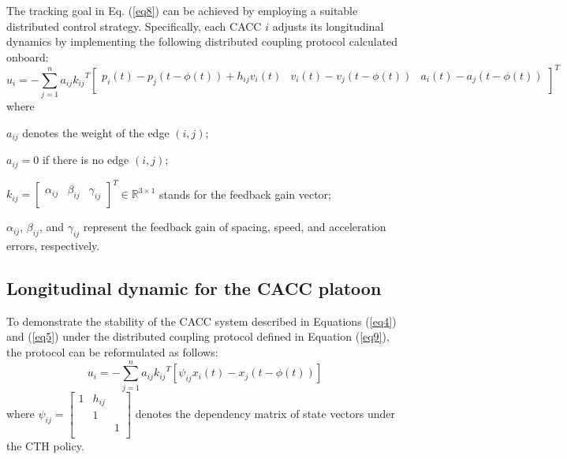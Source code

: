 \documentclass[a4paper]{cas-sc}
\begin{document}
The tracking goal in Eq. (\ref{eq8}) can be achieved by employing a suitable distributed control strategy. Specifically, each CACC $i$ adjusts its longitudinal dynamics by implementing the following distributed coupling protocol calculated onboard:
\begin{equation}
u_i=-\sum_{j=1}^{n}{a_{ij}{k_{ij}}^T\left[\begin{matrix}p_i\left(t\right)-p_j\left(t-\phi(t)\right)+h_{ij}v_i\left(t\right)&v_i\left(t\right)-v_j\left(t-\phi(t)\right)&a_i\left(t\right)-a_j\left(t-\phi(t)\right)\\\end{matrix}\right]^T} 
\label{eq9}
\end{equation}
where
\begin{description}
  \item $a_{ij}$ denotes the weight of the edge $\left(i,j\right)$;
  \item $a_{ij}=0$ if there is no edge $\left(i,j\right)$;
  \item $k_{ij}=\left[\begin{matrix}\alpha_{ij}&\beta_{ij}&\gamma_{ij}\\\end{matrix}\right]^T\in\mathbb{R}^{3\times1}$ stands for the feedback gain vector;
  \item $\alpha_{ij}$, $\beta_{ij}$, and $\gamma_{ij}$ represent the feedback gain of spacing, speed, and acceleration errors, respectively.
\end{description}

\subsection{Longitudinal dynamic for the CACC platoon}
\label{Section 3.2}


To demonstrate the stability of the CACC system described in Equations (\ref{eq4}) and (\ref{eq5}) under the distributed coupling protocol defined in Equation (\ref{eq9}), the protocol can be reformulated as follows:
\begin{equation}
u_i=-\sum_{j=1}^{n}{a_{ij}{k_{ij}}^T\left[\psi_{ij}x_i(t)-x_j(t-\phi(t))\right]}   
\label{eq10}
\end{equation}    
where $\psi_{ij}=\left[\begin{matrix}1&h_{ij}&\\&1&\\&&1\\\end{matrix}\right]$ denotes the dependency matrix of state vectors under the CTH policy.
\end{document}
